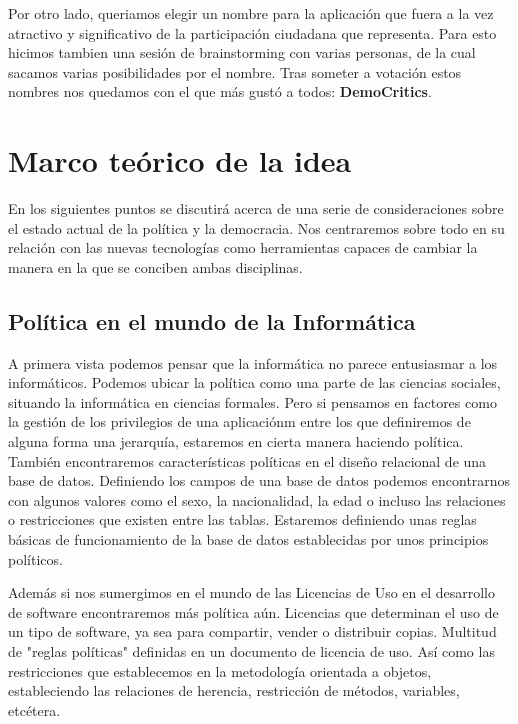 Por otro lado, queriamos elegir un nombre para la aplicación que fuera a la vez atractivo y significativo de la participación ciudadana que representa. Para esto hicimos tambien una sesión de brainstorming con varias personas, de la cual sacamos varias posibilidades por el nombre. Tras someter a votación estos nombres nos quedamos con el que más gustó a todos: \textbf{DemoCritics}.

\section{Marco teórico de la idea}

En los siguientes puntos se discutirá acerca de una serie de consideraciones sobre el estado actual de la política y la democracia. Nos centraremos sobre todo en su relación con las nuevas tecnologías como herramientas capaces de cambiar la manera en la que se conciben ambas disciplinas.

\subsection{Política en el mundo de la Informática}

A primera vista podemos pensar que la informática no parece entusiasmar a los informáticos. Podemos ubicar la política como una parte de las ciencias sociales, situando la informática en ciencias formales. Pero si pensamos en factores como la gestión de los privilegios de una aplicaciónm entre los que definiremos de alguna forma una jerarquía, estaremos en cierta manera haciendo política. También encontraremos características políticas en el diseño relacional de una base de datos. Definiendo los campos de una base de datos podemos encontrarnos con algunos valores como el sexo, la nacionalidad, la edad o incluso las relaciones o restricciones que existen entre las tablas. Estaremos definiendo unas reglas básicas de funcionamiento de la base de datos establecidas por unos principios políticos.

Además si nos sumergimos en el mundo de las Licencias de Uso en el desarrollo de software encontraremos más política aún. Licencias que determinan el uso de un tipo de software, ya sea para compartir, vender o distribuir copias. Multitud de "reglas políticas" definidas en un documento de licencia de uso. Así como las restricciones que establecemos en la metodología orientada a objetos, estableciendo las relaciones de herencia, restricción de métodos, variables, etcétera.

